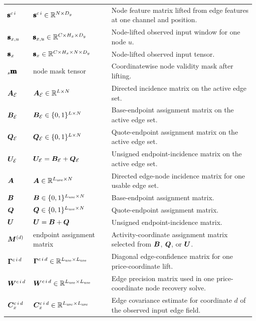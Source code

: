 \begin{center}
\begin{longtable}{>{\raggedright\arraybackslash}p{}
                  >{\raggedright\arraybackslash}p{}
                  >{\raggedright\arraybackslash}p{}}
$\pmb{\mathbf{s}}^{c\,i}$ & $\pmb{\mathbf{s}}^{c\,i}\in\mathbb{R}^{N\times D_y}$ & Node feature matrix lifted from edge features at one channel and position. \\
$\pmb{\mathbf{s}}_{x,u}$ & $\pmb{\mathbf{s}}_{x,u}\in\mathbb{R}^{C\times H_x\times D_y}$ & Node-lifted observed input window for one node $u$. \\
$\pmb{\mathbf{s}}_{x}$ & $\pmb{\mathbf{s}}_{x}\in\mathbb{R}^{C\times H_x\times N\times D_y}$ & Node-lifted observed input tensor. \\
${}_{s}\pmb{\mathbf{m}}$ & node mask tensor & Coordinatewise node validity mask after lifting. \\
$\bm{A}_{\mathcal{E}}$ & $\bm{A}_{\mathcal{E}}\in\mathbb{R}^{L\times N}$ & Directed incidence matrix on the active edge set. \\
$\bm{B}_{\mathcal{E}}$ & $\bm{B}_{\mathcal{E}}\in\{0,1\}^{L\times N}$ & Base-endpoint assignment matrix on the active edge set. \\
$\bm{Q}_{\mathcal{E}}$ & $\bm{Q}_{\mathcal{E}}\in\{0,1\}^{L\times N}$ & Quote-endpoint assignment matrix on the active edge set. \\
$\bm{U}_{\mathcal{E}}$ & $\bm{U}_{\mathcal{E}}=\bm{B}_{\mathcal{E}}+\bm{Q}_{\mathcal{E}}$ & Unsigned endpoint-incidence matrix on the active edge set. \\
$\bm{A}$ & $\bm{A} \in \mathbb{R}^{L_{\mathrm{use}} \times N}$ & Directed edge-node incidence matrix for one usable edge set. \\
$\bm{B}$ & $\bm{B}\in\{0,1\}^{L_{\mathrm{use}}\times N}$ & Base-endpoint assignment matrix. \\
$\bm{Q}$ & $\bm{Q}\in\{0,1\}^{L_{\mathrm{use}}\times N}$ & Quote-endpoint assignment matrix. \\
$\bm{U}$ & $\bm{U}=\bm{B}+\bm{Q}$ & Unsigned endpoint-incidence matrix. \\
$\bm{M}^{(d)}$ & endpoint assignment matrix & Activity-coordinate assignment matrix selected from $\bm{B}$, $\bm{Q}$, or $\bm{U}$. \\
$\bm{\Gamma}^{c\,i\,d}$ & $\bm{\Gamma}^{c\,i\,d}\in\mathbb{R}^{L_{\mathrm{use}}\times L_{\mathrm{use}}}$ & Diagonal edge-confidence matrix for one price-coordinate lift. \\
$\bm{W}^{c\,i\,d}$ & $\bm{W}^{c\,i\,d}\in\mathbb{R}^{L_{\mathrm{use}}\times L_{\mathrm{use}}}$ & Edge precision matrix used in one price-coordinate node recovery solve. \\
$\bm{C}_{x}^{c\,i\,d}$ & $\bm{C}_{x}^{c\,i\,d}\in\mathbb{R}^{L_{\mathrm{use}}\times L_{\mathrm{use}}}$ & Edge covariance estimate for coordinate $d$ of the observed input edge field. \\

\end{longtable}
\end{center}
